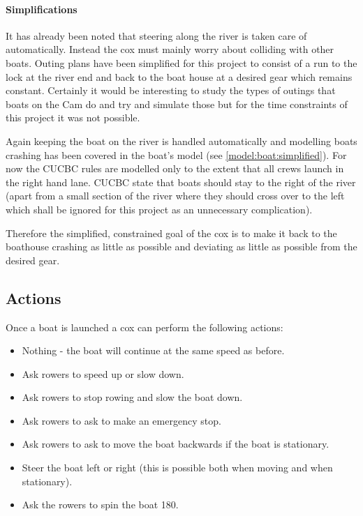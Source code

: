       \paragraph{Simplifications}
      It has already been noted that steering along the river is taken care of automatically. Instead the cox must mainly worry about colliding with other boats. Outing plans have been simplified for this project to consist of a run to the lock at the river end and back to the boat house at a desired gear which remains constant. Certainly it would be interesting to study the types of outings that boats on the Cam do and try and simulate those but for the time constraints of this project it was not possible.
      
      Again keeping the boat on the river is handled automatically and modelling boats crashing has been covered in the boat's model (see \ref{model:boat:simplified}). For now the CUCBC rules are modelled only to the extent that all crews launch in the right hand lane. CUCBC state that boats should stay to the right of the river (apart from a small section of the river where they should cross over to the left which shall be ignored for this project as an unnecessary complication).
      
      Therefore the simplified, constrained goal of the cox is to make it back to the boathouse crashing as little as possible and deviating as little as possible from the desired gear.

      \subsection{Actions} \label{model:cox:actions}
      Once a boat is launched a cox can perform the following actions:
      \begin{itemize}
        \item Nothing - the boat will continue at the same speed as before.
        \item Ask rowers to speed up or slow down.
        \item Ask rowers to stop rowing and slow the boat down.
        \item Ask rowers to ask to make an emergency stop.
        \item Ask rowers to ask to move the boat backwards if the boat is stationary.
        \item Steer the boat left or right (this is possible both when moving and when stationary).
        \item Ask the rowers to spin the boat 180\textdegree.
      \end{itemize}
        
